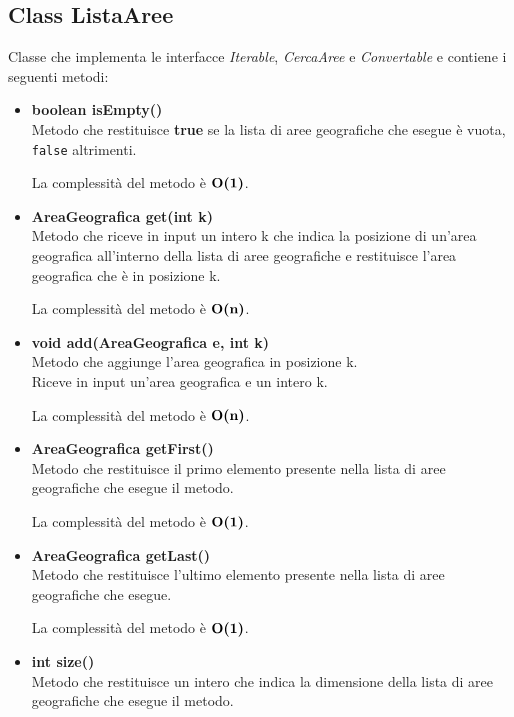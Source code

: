 \documentclass[a4paper, 12pt]{scrreprt}
\begin{document}
			\subsection{Class ListaAree}
			Classe che implementa le interfacce \textsl{Iterable}, \textsl{CercaAree} e \textsl{Convertable} e contiene i seguenti metodi:
			\begin{itemize}
				\item \textbf{boolean isEmpty()}
				\\Metodo che restituisce \textbf{true} se la lista di aree geografiche che esegue \`e vuota, \verb!false! altrimenti.

				La complessit\`a del metodo \`e $\mathbf{O}\textbf{(1)}$.

				\item \textbf{AreaGeografica get(int k)}
				\\Metodo che riceve in input un intero k che indica la posizione di un'area geografica all'interno della lista di aree geografiche e restituisce l'area geografica che \`e in posizione k.

				La complessit\`a del metodo \`e $\mathbf{O}\textbf{(n)}$.

				\item \textbf{void add(AreaGeografica e, int k)}
				\\Metodo che aggiunge l'area geografica in posizione k.
				\\Riceve in input un'area geografica e un intero k.

				La complessit\`a del metodo \`e $\mathbf{O}\textbf{(n)}$.

				\item \textbf{AreaGeografica getFirst()}
				\\Metodo che restituisce il primo elemento presente nella lista di aree geografiche che esegue il metodo.

				La complessit\`a del metodo \`e $\mathbf{O}\textbf{(1)}$.

				\item \textbf{AreaGeografica getLast()}
				\\Metodo che restituisce l'ultimo elemento presente nella lista di aree geografiche che esegue.

				La complessit\`a del metodo \`e $\mathbf{O}\textbf{(1)}$.
				\pagebreak
				\item \textbf{int size()}
				\\Metodo che restituisce un intero che indica la dimensione della lista di aree geografiche che esegue il metodo.


\end{itemize}
\end{document}
